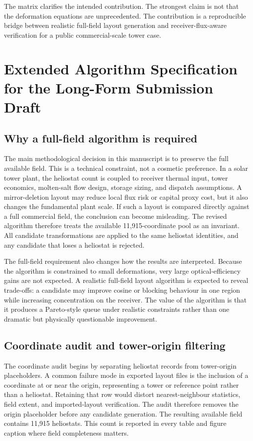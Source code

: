 \documentclass[final,3p,times]{elsarticle}
\begin{document}
The matrix clarifies the intended contribution. The strongest claim is not that the deformation equations are unprecedented. The contribution is a reproducible bridge between realistic full-field layout generation and receiver-flux-aware verification for a public commercial-scale tower case.

\section{Extended Algorithm Specification for the Long-Form Submission Draft}
\subsection{Why a full-field algorithm is required}
The main methodological decision in this manuscript is to preserve the full available field. This is a technical constraint, not a cosmetic preference. In a solar tower plant, the heliostat count is coupled to receiver thermal input, tower economics, molten-salt flow design, storage sizing, and dispatch assumptions. A mirror-deletion layout may reduce local flux risk or capital proxy cost, but it also changes the fundamental plant scale. If such a layout is compared directly against a full commercial field, the conclusion can become misleading. The revised algorithm therefore treats the available 11,915-coordinate pool as an invariant. All candidate transformations are applied to the same heliostat identities, and any candidate that loses a heliostat is rejected.

The full-field requirement also changes how the results are interpreted. Because the algorithm is constrained to small deformations, very large optical-efficiency gains are not expected. A realistic full-field layout algorithm is expected to reveal trade-offs: a candidate may improve cosine or blocking behaviour in one region while increasing concentration on the receiver. The value of the algorithm is that it produces a Pareto-style queue under realistic constraints rather than one dramatic but physically questionable improvement.

\subsection{Coordinate audit and tower-origin filtering}
The coordinate audit begins by separating heliostat records from tower-origin placeholders. A common failure mode in exported layout files is the inclusion of a coordinate at or near the origin, representing a tower or reference point rather than a heliostat. Retaining that row would distort nearest-neighbour statistics, field extent, and imported-layout verification. The audit therefore removes the origin placeholder before any candidate generation. The resulting available field contains 11,915 heliostats. This count is reported in every table and figure caption where field completeness matters.
\end{document}
